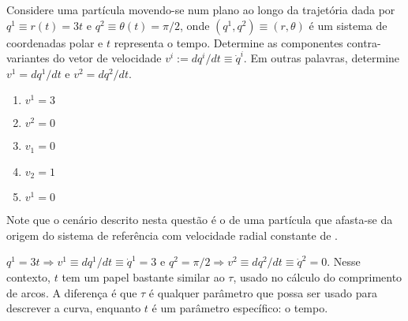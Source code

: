 \begin{question}
    Considere uma partícula movendo-se num plano ao longo da trajetória dada por $q^1 \equiv r(t) = 3t$ e $q^2 \equiv \theta(t) = \pi/2$, onde $(q^1, q^2) \equiv (r,\theta)$ é um sistema de coordenadas polar e $t$ representa o tempo.
    Determine as componentes contra-variantes do vetor de velocidade $v^i := dq^i/dt \equiv \dot q^i$.
    Em outras palavras, determine $v^1 = dq^1/dt$ e $v^2 = dq^2/dt$.
    \begin{enumerate}
      \item $v^1 = 3$ \rightanswer
      \item $v^2 = 0$ \rightanswer
      \item $v_1 = 0$
      \item $v_2 = 1$
      \item $v^1 = 0$
    \end{enumerate}

    Note que o cenário descrito nesta questão é o de uma partícula que afasta-se da origem do sistema de referência com velocidade radial constante de .

    \begin{solution}
      $q^1 = 3t \Rightarrow v^1 \equiv dq^1/dt \equiv \dot q^1 = 3$ e $q^2 = \pi/2 \Rightarrow v^2 \equiv dq^2/dt \equiv \dot q^2 = 0$.
      Nesse contexto, $t$ tem um papel bastante similar ao $\tau$, usado no cálculo do comprimento de arcos.
      A diferença é que $\tau$ é qualquer parâmetro que possa ser usado para descrever a curva, enquanto $t$ é um parâmetro específico: o tempo.
    \end{solution}
\end{question}